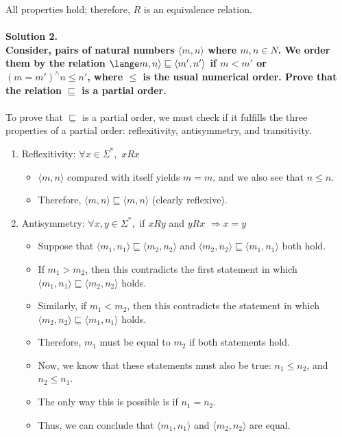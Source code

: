 \documentclass{article}
\begin{document}
All properties hold; therefore, \(R\) is an equivalence relation.
\\
\\\noindent \textbf{Solution 2. 
\\Consider, pairs of natural numbers \( \langle m, n \rangle\) where \(m, n\in N\). We order them by the relation \( \lange m, n\rangle \sqsubseteq \langle m', n'\rangle\) if \(m < m'\) or \((m = m') ^ \land n \leq n'\), where \(\leq\) is the usual numerical order. Prove that the relation \(\sqsubseteq\) is a partial order.}
\\
\\To prove that \(\sqsubseteq\) is a partial order, we must check if it fulfills the three properties of a partial order: reflexitivity, antisymmetry, and transitivity.
\begin{enumerate}
    \item Reflexitivity: \(\forall x \in \Sigma ^ *,\) \(xRx\)
    \begin{itemize}
        \item \( \langle m, n \rangle\) compared with itself yields \(m=m\), and we also see that \(n \leq n\).
        \item Therefore, \( \langle m, n \rangle \sqsubseteq \langle m, n \rangle\) (clearly reflexive).
    \end{itemize}
    \item Antisymmetry: \(\forall x,y \in \Sigma ^ *,\) if \(xRy\) and \(yRx\) \(\Longrightarrow x=y\)
    \begin{itemize}
        \item Suppose that \( \langle m_1, n_1 \rangle \sqsubseteq \langle m_2, n_2 \rangle\) and \( \langle m_2, n_2 \rangle \sqsubseteq \langle m_1, n_1 \rangle\) both hold.
        \item If \(m_1>m_2\), then this contradicts the first statement in which  \( \langle m_1, n_1 \rangle \sqsubseteq \langle m_2, n_2 \rangle\) holds. 
        \item Similarly, if \(m_1<m_2\), then this contradicts the statement in which \( \langle m_2, n_2 \rangle \sqsubseteq \langle m_1, n_1 \rangle\) holds.
        \item Therefore, \(m_1\) must be equal to \(m_2\) if both statements hold.
        \item Now, we know that these statements must also be true: \(n_1\leq n_2\), and \(n_2\leq n_1\).
        \item The only way this is possible is if \(n_1 = n_2\).
        \item Thus, we can conclude that \( \langle m_1, n_1 \rangle\) and \( \langle m_2, n_2 \rangle\) are equal.

\end{itemize}
\end{enumerate}
\end{document}
